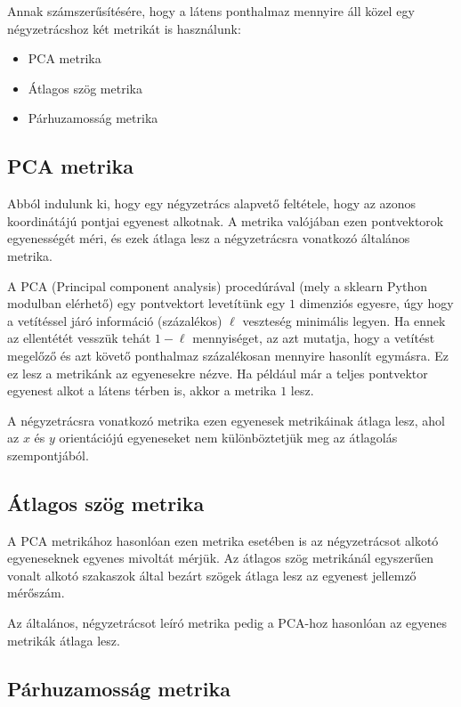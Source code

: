 Annak számszerűsítésére, hogy a látens ponthalmaz mennyire áll közel egy négyzetrácshoz két metrikát is használunk:
\begin{itemize}
  \item PCA metrika
  \item Átlagos szög metrika
  \item Párhuzamosság metrika
\end{itemize}

\subsection{PCA metrika}

Abból indulunk ki, hogy egy négyzetrács alapvető feltétele, hogy az
azonos koordinátájú pontjai egyenest alkotnak. A metrika valójában ezen
pontvektorok egyenességét méri, és ezek átlaga lesz a négyzetrácsra
vonatkozó általános metrika.

A PCA (Principal component analysis) procedúrával (mely a sklearn Python modulban elérhető) egy pontvektort levetítünk egy $1$ dimenziós egyesre, úgy hogy a vetítéssel járó információ (százalékos) $\ell$ veszteség minimális legyen. Ha ennek az ellentétét vesszük tehát $1-\ell$ mennyiséget, az azt mutatja, hogy a vetítést megelőző és azt követő ponthalmaz százalékosan mennyire hasonlít egymásra. Ez ez lesz a metrikánk az egyenesekre nézve. Ha például már a teljes pontvektor egyenest alkot a látens térben is, akkor a metrika $1$ lesz.

A négyzetrácsra vonatkozó metrika ezen egyenesek metrikáinak átlaga lesz, ahol az $x$ és $y$ orientációjú egyeneseket nem különböztetjük meg az átlagolás szempontjából.

\subsection{Átlagos szög metrika}

A PCA metrikához hasonlóan ezen metrika esetében is az négyzetrácsot alkotó egyeneseknek egyenes mivoltát mérjük. Az átlagos szög metrikánál egyszerűen vonalt alkotó szakaszok által bezárt szögek átlaga lesz az egyenest jellemző mérőszám. 

Az általános, négyzetrácsot leíró metrika pedig a PCA-hoz hasonlóan az egyenes metrikák átlaga lesz.

\subsection{Párhuzamosság metrika}

